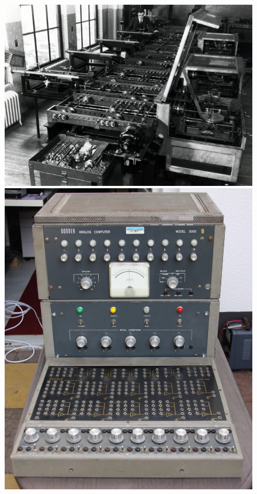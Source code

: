 \documentclass[a4paper]{article}
\begin{document}
{		\bigskip
		
		\begin{figure}[!h]
				\begin{minipage}[h]{2 in}
					\centering
					\includegraphics[scale = 0.2]{mehanicki.jpg}
				\end{minipage}
				\hfill
				\begin{minipage}[h]{2in}
					\centering
					\includegraphics[scale = 0.067]{elektronski.jpg}
				\end{minipage}


\end{figure}}
\end{document}

